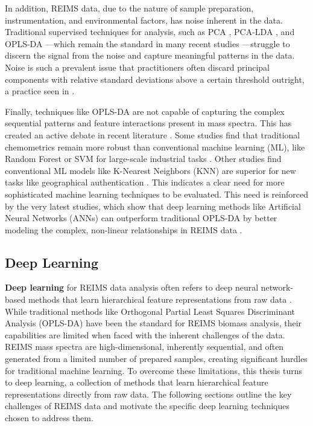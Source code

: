 In addition, REIMS data, due to the nature of sample preparation, instrumentation, and environmental factors, has noise inherent in the data. Traditional supervised techniques for analysis, such as PCA \citep{Schaefer2009}, PCA-LDA \citep{Balog2010, Balog2013, Balog2016}, and OPLS-DA \citep{Bylesjoe2006, Boccard2013}---which remain the standard in many recent studies \citep{Black2017, Black2019, Verplanken2016, Gkarane2025, Shen2020, Shen2022}---struggle to discern the signal from the noise and capture meaningful patterns in the data. Noise is such a prevalent issue that practitioners often discard principal components with relative standard deviations above a certain threshold outright, a practice seen in \citep{Black2017, Black2019}.

Finally, techniques like OPLS-DA are not capable of capturing the complex sequential patterns and feature interactions present in mass spectra. This has created an active debate in recent literature \citep{Xue2025}. Some studies find that traditional chemometrics remain more robust than conventional machine learning (ML), like Random Forest or SVM for large-scale industrial tasks \citep{De2023}. Other studies find conventional ML models like K-Nearest Neighbors (KNN) are superior for new tasks like geographical authentication \citep{Lu2024}. This indicates a clear need for more sophisticated machine learning techniques to be evaluated. This need is reinforced by the very latest studies, which show that deep learning methods like Artificial Neural Networks (ANNs) can outperform traditional OPLS-DA by better modeling the complex, non-linear relationships in REIMS data \citep{Cardoso2025}.

\subsection{Deep Learning}

\textbf{Deep learning} for REIMS data analysis often refers to deep neural network-based methods that learn hierarchical feature representations from raw data \citep{Goodfellow2016}. While traditional methods like Orthogonal Partial Least Squares Discriminant Analysis (OPLS-DA) \citep{Bylesjoe2006} have been the standard for REIMS biomass analysis, their capabilities are limited when faced with the inherent challenges of the data. REIMS mass spectra are high-dimensional, inherently sequential, and often generated from a limited number of prepared samples, creating significant hurdles for traditional machine learning. To overcome these limitations, this thesis turns to deep learning, a collection of methods that learn hierarchical feature representations directly from raw data. The following sections outline the key challenges of REIMS data and motivate the specific deep learning techniques chosen to address them.

